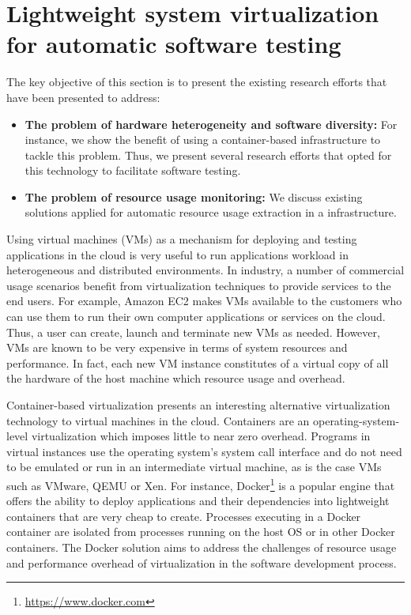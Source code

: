\section{Lightweight system virtualization for automatic software testing}
\label{sec:Lightweight system virtualization for software testing}

The key objective of this section is to present the existing research efforts that have been presented to address:
\begin{itemize}
	\item \textbf{The problem of hardware heterogeneity and software diversity:} For instance, we show the benefit of using a container-based infrastructure to tackle this problem. Thus, we present several research efforts that opted for this technology to facilitate software testing. 
	
	\item \textbf{The problem of resource usage monitoring:} We discuss existing solutions applied for automatic resource usage extraction in a  infrastructure. 
\end{itemize}


Using virtual machines (VMs) as a mechanism for deploying and testing applications in the cloud is very useful to run applications workload in heterogeneous and distributed environments.
In industry, a number of commercial usage scenarios benefit from virtualization techniques to provide services to the end users. For example, Amazon EC2 makes VMs available to the customers who can use them to run their own computer applications or services on the cloud. Thus, a user can create, launch and terminate new VMs as needed.  
However, VMs are known to be very expensive in terms of system resources and performance. In fact, each new VM instance constitutes of a virtual copy of all the hardware of the host machine which  resource usage and overhead\cite{merkel2014docker}. 

Container-based virtualization presents an interesting alternative virtualization technology to virtual machines in the cloud. Containers are an operating-system-level virtualization which imposes little to near zero overhead. Programs in virtual instances use the operating system's system call interface and do not need to be emulated or run in an intermediate virtual machine, as is the case VMs such as VMware, QEMU or Xen.
For instance, Docker\footnote{\url{https://www.docker.com}} is a popular engine that offers the ability to deploy applications and their dependencies into lightweight containers that are very cheap to create. Processes executing in a Docker container are isolated from processes running on the host OS or in other Docker containers. The Docker solution aims to address the challenges of resource usage and performance overhead of virtualization in the software development process. 

